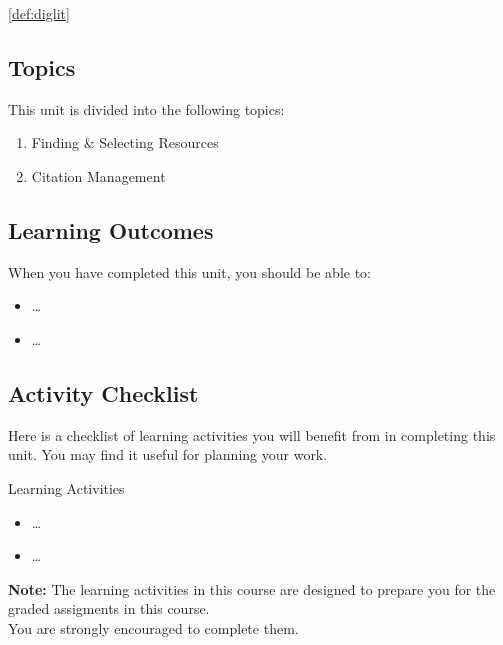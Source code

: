 \documentclass[
]{book}
\providecommand{\tightlist}{%
  \setlength{\itemsep}{0pt}\setlength{\parskip}{0pt}}
\theoremstyle{definition}
\theoremstyle{definition}
\theoremstyle{definition}
\theoremstyle{definition}
\theoremstyle{remark}
\begin{document}
\ref{def:diglit}

\hypertarget{topics-1}{%
\subsection*{Topics}\label{topics-1}}

This unit is divided into the following topics:

\begin{enumerate}
\def\labelenumi{\arabic{enumi}.}
\tightlist
\item
  Finding \& Selecting Resources
\item
  Citation Management
\end{enumerate}

\hypertarget{learning-outcomes-1}{%
\subsection*{Learning Outcomes}\label{learning-outcomes-1}}

When you have completed this unit, you should be able to:

\begin{itemize}
\tightlist
\item
  \ldots{}
\item
  \ldots{}
\end{itemize}

\hypertarget{activity-checklist-1}{%
\subsection*{Activity Checklist}\label{activity-checklist-1}}

Here is a checklist of learning activities you will benefit from in completing this unit. You may find it useful for planning your work.

\begin{reflect}
{Learning Activities}

\begin{itemize}
\tightlist
\item
  \ldots{}
\item
  \ldots{}
\end{itemize}

\textbf{Note:} The learning activities in this course are designed to prepare you for the graded assigments in this course.\\
You are strongly encouraged to complete them.
\end{reflect}
\end{document}

